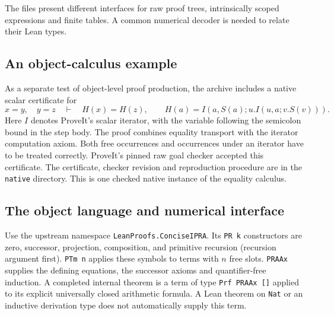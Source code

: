 The files present different interfaces for raw proof trees, intrinsically scoped expressions and finite tables. A common numerical decoder is needed to relate their Lean types.

\subsection{An object-calculus example}
As a separate test of object-level proof production, the archive includes a native scalar certificate for
\[
     x=y,\quad y=z\quad\vdash\quad H(x)=H(z),\qquad
     H(a)=I(a,S(a);u.I(u,a;v.S(v))).
\]
Here $I$ denotes ProveIt's scalar iterator, with the variable following the semicolon bound in the step body. The proof combines equality transport with the iterator computation axiom. Both free occurrences and occurrences under an iterator have to be treated correctly. ProveIt's pinned raw goal checker accepted this certificate. The certificate, checker revision and reproduction procedure are in the \texttt{native} directory. This is one checked native instance of the equality calculus.

\subsection{The object language and numerical interface}
Use the upstream namespace \texttt{LeanProofs.ConciseIPRA}. Its \texttt{PR k} constructors are zero, successor, projection, composition, and primitive recursion (recursion argument first). \texttt{PTm n} applies these symbols to terms with $n$ free slots. \texttt{PRAAx} supplies the defining equations, the successor axioms and quantifier-free induction. A completed internal theorem is a term of type \texttt{Prf PRAAx []} applied to its explicit universally closed arithmetic formula. A Lean theorem on \texttt{Nat} or an inductive derivation type does not automatically supply this term.

